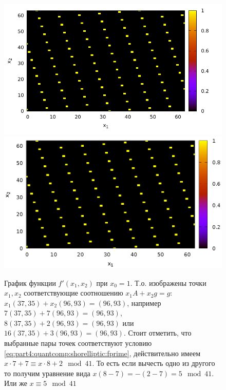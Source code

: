 \begin{figure}
\centering

\ifpdf
\includegraphics[angle=0]
{./part4/quantcomp/picellipticdiscretlog1.pdf}
\else
\includegraphics[angle=0]
{./part4/quantcomp/picellipticdiscretlog1.eps}
\fi

%




\caption{График функции 
$f'(x_1, x_2)$ при $x_0 = 1$. Т.о. изображены точки $x_1, x_2$
  соответствующие соотношению $x_1 A + x_2 g = g$: 
  $x_1 (37, 35) + x_2 (96,93) = (96,93)$, например
  $7 (37, 35) + 7 (96,93) = (96,93)$, $8 (37, 35) + 2 (96,93) =
  (96,93)$ или $16 (37, 35) + 3 (96,93) =
  (96,93)$. Стоит отметить, что выбранные пары точек соответствуют
  условию \eqref{eq:part4:quantcomp:shorelliptic:fprime}, действительно
 имеем $x \cdot 7 + 7 \equiv x \cdot 8 + 2 \mod 41$. 
 То есть если вычесть одно из другого то
 получим уравнение вида $x \left(8-7\right) = - (2 - 7) = 5 \mod 41$.
 Или же $x \equiv 5 \mod 41$} 
\label{fig:part4:quantcomp:dle1}
\end{figure}
